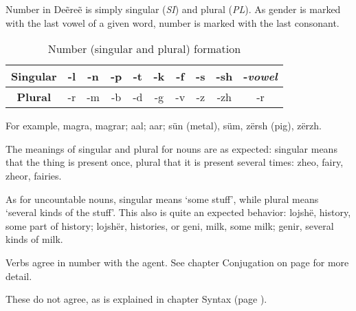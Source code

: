 Number in Deẽreẽ is simply singular (\emph{SI}) and plural (\emph{PL}). As gender is marked with the
last vowel of a given word, number is marked with the last consonant.

\begin{table}[h]\label{tab:morph-number}
\begin{center}
\begin{tabular}{|c|ccccccccc|}
\hline
\textbf{Singular} & -l & -n & -p & -t & -k & -f & -s & -sh & -\emph{vowel}\\\hline
\textbf{Plural}   & -r & -m & -b & -d & -g & -v & -z & -zh & -r\\\hline
\end{tabular}
\end{center}
\caption{Number (singular and plural) formation}
\end{table}

For example, magra, magrar; aal; aar; \gls{sün} (metal), süm, 
\gls{zërsh} (pig), zërzh.

The meanings of singular and plural for nouns are as expected: singular means that the thing is
present once, plural that it is present several times: \gls{zheo}, fairy,
\gls{zheo}r, fairies.

As for uncountable nouns, singular means ‘some stuff’, while plural means ‘several kinds of the
stuff’. This also is quite an expected behavior: \gls{lojshë}, history,
some part of history; \gls{lojshë}r, histories, or \gls{geni}, milk, some milk;
\gls{geni}r, several kinds of milk.

Verbs agree in number with the agent. See chapter Conjugation on page \pageref{chap:conjugation} for
more detail.

These do not agree, as is explained in chapter Syntax (page \pageref{chap:syntax}).

